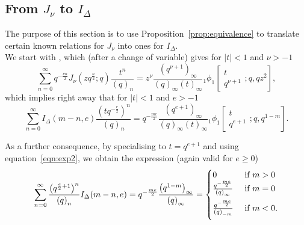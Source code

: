 \documentclass[11pt]{amsart}
\newcommand{\tet}{I_{\Delta}}
\begin{document}
\subsection{From $J_\nu$ to $\tet$}


The purpose of this section is to use Proposition~\ref{prop:equivalence} to translate certain known relations for $J_\nu$ into ones for $\tet$. \\

We start with \cite[Prop.~3.2]{groenevelt20183}, which (after a change of variable) gives
for $|t|<1$ and $\nu > -1$
\begin{equation}
\sum_{n = 0}^\infty q^{-\frac{\nu n}{2}} J_\nu \left(z q^\frac{n}2;q\right) \frac{t^n}{\left(q\right)_n} = z^{\nu} \frac{\left(q^{\nu+1}\right)_\infty}{\left(q\right)_\infty \left(t\right)_\infty} {_1 \phi_1}\left[\begin{matrix} t  \\ q^{\nu+1}  \end{matrix} ; q, q z^2 \right],
\end{equation}
which implies right away that for $|t|< 1$ and $e > -1$
\begin{equation}
\sum_{n = 0}^\infty I_\Delta \left(m-n, e\right)\frac{\left(t q^{-\frac{e}{2}}\right)^n}{\left(q\right)_n} = q^{-\frac{me}{2}} \frac{\left(q^{e+1}\right)_\infty}{\left(q\right)_\infty \left(t\right)_\infty} {_1 \phi_1}\left[\begin{matrix} t  \\ q^{e+1}  \end{matrix} ; q, q^{1-m}  \right].
\end{equation}



As a further consequence, by specialising to $t = q^{e+1}$ and using equation~\eqref{eqn:exp2}, we obtain the expression (again valid for $e \ge 0$)
\begin{equation*}
\sum_{n=0}^\infty \frac{\left( q^{\frac{e}2 +1}\right)^n}{\left(q\right)_n} \tet (m-n,e) = q^{-\frac{me}{2}} \frac{\left( q^{1-m}\right)_\infty}{\left( q\right)_\infty} = \begin{cases}
0 & \text{ if }m>0\\ \vspace{0.2cm}
\frac{q^{-\frac{me}{2}}}{\left( q\right)_{\infty}} & \text{ if }m=0\\  \vspace{0.2cm}
\frac{q^{-\frac{me}{2}}}{\left( q\right)_{-m}} & \text{ if }m<0.
\end{cases}
\end{equation*}
\end{document}
